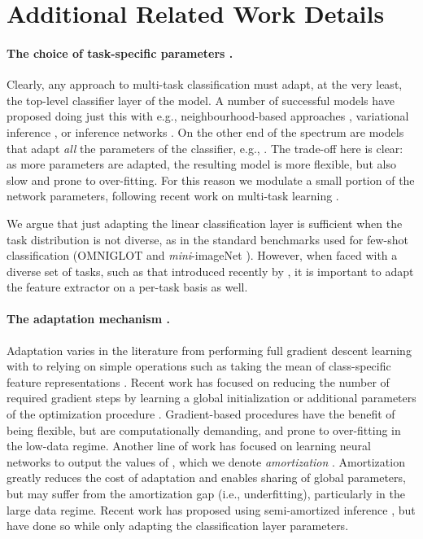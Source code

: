 \documentclass{article}
\theoremstyle{definition}
\begin{document}
\section{Additional Related Work Details}
\label{app:related_work}

\paragraph{The choice of task-specific parameters .} Clearly, any approach to multi-task classification must adapt, at the very least, the top-level classifier layer of the model. A number of successful models have proposed doing just this with e.g., neighbourhood-based approaches \citep{snell2017prototypical}, variational inference \citep{bauer2017discriminative}, or inference networks \citep{gordon2018meta}. On the other end of the spectrum are models that adapt \textit{all} the parameters of the classifier, e.g., \citep{finn2017model,nichol2018reptile,kim2018bayesian}. The trade-off here is clear: as more parameters are adapted, the resulting model is more flexible, but also slow and prone to over-fitting. For this reason we modulate a small portion of the network parameters, following recent work on multi-task learning \citep{rebuffi2017learning, rebuffi2018efficient, perez2018film}.

We argue that just adapting the linear classification layer is sufficient when the task distribution is not diverse, as in the standard benchmarks used for few-shot classification (OMNIGLOT \citep{lake2011one} and \textit{mini}-imageNet \citep{ravi2016optimization}). However, when faced with a diverse set of tasks, such as that introduced recently by \citet{triantafillou2019meta}, it is important to adapt the feature extractor on a per-task basis as well. 

\paragraph{The adaptation mechanism .} Adaptation varies in the literature from performing full gradient descent learning with  \cite{yosinski2014transferable} to relying on simple operations such as taking the mean of class-specific feature representations \citep{snell2017prototypical,vinyals2016matching}. Recent work has focused on reducing the number of required gradient steps by learning a global initialization \citep{finn2017model,nichol2018reptile} or additional parameters of the optimization procedure \citep{ravi2016optimization}. Gradient-based procedures have the benefit of being flexible, but are computationally demanding, and prone to over-fitting in the low-data regime. Another line of work has focused on learning neural networks to output the values of , which we denote \textit{amortization} \citep{gordon2018meta}. Amortization greatly reduces the cost of adaptation and enables sharing of global parameters, but may suffer from the amortization gap \citep{cremer2018inference} (i.e., underfitting), particularly in the large data regime. Recent work has proposed using semi-amortized inference \citep{triantafillou2019meta,rusu2018meta}, but have done so while only adapting the classification layer parameters. 
\end{document}
